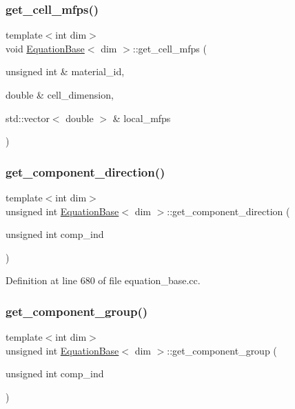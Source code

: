 \subsubsection{\texorpdfstring{get\+\_\+cell\+\_\+mfps()}{get\_cell\_mfps()}}
{\footnotesize\ttfamily template$<$int dim$>$ \\
void \hyperlink{class_equation_base}{Equation\+Base}$<$ dim $>$\+::get\+\_\+cell\+\_\+mfps (\begin{DoxyParamCaption}\item[{unsigned int \&}]{material\+\_\+id,  }\item[{double \&}]{cell\+\_\+dimension,  }\item[{std\+::vector$<$ double $>$ \&}]{local\+\_\+mfps }\end{DoxyParamCaption})\hspace{0.3cm}{\ttfamily [private]}}

\mbox{\label{class_equation_base_a4feaa86bdd6e84c4fc9195df67890c6a}} 
\subsubsection{\texorpdfstring{get\+\_\+component\+\_\+direction()}{get\_component\_direction()}}
{\footnotesize\ttfamily template$<$int dim$>$ \\
unsigned int \hyperlink{class_equation_base}{Equation\+Base}$<$ dim $>$\+::get\+\_\+component\+\_\+direction (\begin{DoxyParamCaption}\item[{unsigned int}]{comp\+\_\+ind }\end{DoxyParamCaption})\hspace{0.3cm}{\ttfamily [virtual]}}



Definition at line 680 of file equation\+\_\+base.\+cc.

\mbox{\label{class_equation_base_a43a783f117149eac90a770d471cd7671}} 
\subsubsection{\texorpdfstring{get\+\_\+component\+\_\+group()}{get\_component\_group()}}
{\footnotesize\ttfamily template$<$int dim$>$ \\
unsigned int \hyperlink{class_equation_base}{Equation\+Base}$<$ dim $>$\+::get\+\_\+component\+\_\+group (\begin{DoxyParamCaption}\item[{unsigned int}]{comp\+\_\+ind }\end{DoxyParamCaption})\hspace{0.3cm}{\ttfamily [virtual]}}



